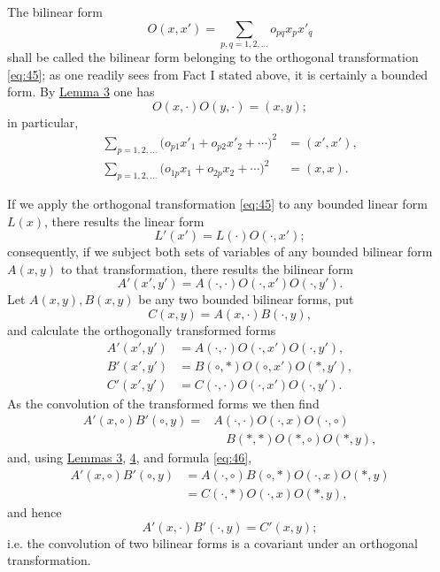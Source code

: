 \documentclass[b5paper,twoside]{article}
\newcommand{\originalpage}[1]{\phantomsection\label{origpage:#1}}
\begin{document}
The bilinear form
\[
  O(x,x')=\sum_{p,q=1,2,\ldots}o_{pq}x_p x'_q
\]
shall be called the bilinear form belonging to the orthogonal transformation
\eqref{eq:45}; as one readily sees from \originalpage{181}Fact I stated above,
it is certainly a bounded form.  By \hyperref[lem:3]{Lemma 3} one has
\begin{equation}
\tag{46}\label{eq:46}
  O(x,\mathord{\cdot})O(y,\mathord{\cdot})=(x,y);
\end{equation}
in particular,
\[
\begin{aligned}
  \sum_{p=1,2,\ldots}
  \bigl(o_{p1}x'_1+o_{p2}x'_2+\cdots\bigr)^2&=(x',x'),\\
  \sum_{p=1,2,\ldots}
  \bigl(o_{1p}x_1+o_{2p}x_2+\cdots\bigr)^2&=(x,x).
\end{aligned}
\]

If we apply the orthogonal transformation \eqref{eq:45} to any bounded
linear form $L(x)$, there results the linear form
\[
  L'(x')=L(\mathord{\cdot})O(\mathord{\cdot},x');
\]
consequently, if we subject both sets of variables of any bounded bilinear
form $A(x,y)$ to that transformation, there results the bilinear form
\[
  A'(x',y')
  =A(\mathord{\cdot},\mathord{\cdot})
   O(\mathord{\cdot},x')O(\mathord{\cdot},y').
\]
Let $A(x,y),B(x,y)$ be any two bounded bilinear forms, put
\[
  C(x,y)=A(x,\mathord{\cdot})B(\mathord{\cdot},y),
\]
and calculate the orthogonally transformed forms
\[
\begin{aligned}
  A'(x',y')
    &=A(\mathord{\cdot},\mathord{\cdot})
      O(\mathord{\cdot},x')O(\mathord{\cdot},y'),\\
  B'(x',y')
    &=B(\mathord{\circ},*)O(\mathord{\circ},x')O(*,y'),\\
  C'(x',y')
    &=C(\mathord{\cdot},\mathord{\cdot})
      O(\mathord{\cdot},x')O(\mathord{\cdot},y').
\end{aligned}
\]
As the convolution of the transformed forms we then find
\[
\begin{aligned}
  A'(x,\mathord{\circ})B'(\mathord{\circ},y)
  ={}&A(\mathord{\cdot},\mathord{\cdot})
      O(\mathord{\cdot},x)O(\mathord{\cdot},\mathord{\circ})\\
     &\quad{}B(*,*)O(*,\mathord{\circ})O(*,y),
\end{aligned}
\]
and, using \hyperref[lem:3]{Lemmas 3}, \hyperref[lem:4]{4}, and formula
\eqref{eq:46},
\[
\begin{aligned}
  A'(x,\mathord{\circ})B'(\mathord{\circ},y)
  &=A(\mathord{\cdot},\mathord{\circ})B(\mathord{\circ},*)
    O(\mathord{\cdot},x)O(*,y)\\
  &=C(\mathord{\cdot},*)O(\mathord{\cdot},x)O(*,y),
\end{aligned}
\]
and hence
\begin{equation}
\tag{47}\label{eq:47}
  A'(x,\mathord{\cdot})B'(\mathord{\cdot},y)=C'(x,y);
\end{equation}
i.e. the convolution of two bilinear forms is a covariant under an
orthogonal transformation.
\end{document}
